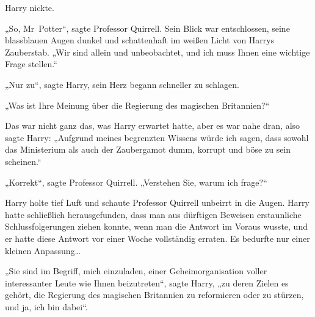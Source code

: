 Harry nickte.

„So, Mr~Potter“, sagte Professor Quirrell. Sein Blick war entschlossen, seine blassblauen Augen dunkel und schattenhaft im weißen Licht von Harrys Zauberstab. „Wir sind allein und unbeobachtet, und ich muss Ihnen eine wichtige Frage stellen.“

„Nur zu“, sagte Harry, sein Herz begann schneller zu schlagen.

„Was ist Ihre Meinung über die Regierung des magischen Britannien?“

Das war nicht ganz das, was Harry erwartet hatte, aber es war nahe dran, also sagte Harry: „Aufgrund meines begrenzten Wissens würde ich sagen, dass sowohl das Ministerium als auch der Zaubergamot dumm, korrupt und böse zu sein scheinen.“

„Korrekt“, sagte Professor Quirrell. „Verstehen Sie, warum ich frage?“

Harry holte tief Luft und schaute Professor Quirrell unbeirrt in die Augen. Harry hatte schließlich herausgefunden, dass man aus dürftigen Beweisen erstaunliche Schlussfolgerungen ziehen konnte, wenn man die Antwort im Voraus wusste, und er hatte diese Antwort vor einer Woche vollständig erraten. Es bedurfte nur einer kleinen Anpassung…

„Sie sind im Begriff, mich einzuladen, einer Geheimorganisation voller interessanter Leute wie Ihnen beizutreten“, sagte Harry, „zu deren Zielen es gehört, die Regierung des magischen Britannien zu reformieren oder zu stürzen, und ja, ich bin dabei“.

